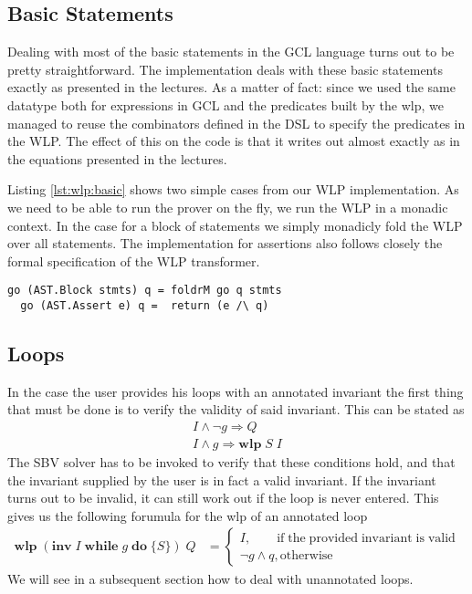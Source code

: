 \documentclass[]{scrartcl}
\newcommand{\IWHILE}[3]{\ensuremath{\mathbf{inv}\;#1\;\mathbf{while}\;#2\;\mathbf{do}\;\{#3\}}}
\newcommand{\WLP}[2]{\ensuremath{\mathbf{wlp}\;#1\;#2}}
\begin{document}
\subsection{Basic Statements}

Dealing with most of the basic statements in the GCL language turns out to
be pretty straightforward. The implementation deals with these basic statements
exactly as presented in the lectures.
As a matter of fact: since we used the same datatype both for expressions in GCL
and the predicates built by the wlp, we managed to reuse the combinators defined
in the DSL to specify the predicates in the WLP. The effect of this on the code
is that it writes out almost exactly as in the equations presented in the lectures.

Listing \ref{lst:wlp:basic} shows two simple cases from our WLP implementation.
As we need to be able to run the prover on the fly, we run the WLP in a monadic context.
In the case for a block of statements we simply monadicly fold the WLP over all statements.
The implementation for assertions also follows closely the formal specification of the
WLP transformer. 

\begin{lstlisting}[caption=WLP implementation example, label=lst:wlp:basic]
  go (AST.Block stmts) q = foldrM go q stmts
  go (AST.Assert e) q =  return (e /\ q)
\end{lstlisting}

\subsection{Loops}

In the case the user provides his loops with an annotated invariant the first
thing that must be done is to verify the validity of said invariant.
This can be stated as
\begin{align}
  I \land \neg g \Rightarrow Q \\
  I \land g \Rightarrow \WLP{S}{I}
\end{align}
The SBV solver has to be invoked to verify that these conditions hold, and that
the invariant supplied by the user is in fact a valid invariant.
If the invariant turns out to be invalid, it can still work out if the loop
is never entered. This gives us the following forumula for the wlp of an annotated
loop
\begin{align}
  \WLP{(\IWHILE{I}{g}{S})}{Q} &=
    \begin{cases}
      I, \qquad  \mathrm{if \; the \; provided \; invariant \; is \; valid}\\
      \neg g \land q, \mathrm{otherwise}
    \end{cases}
\end{align}
We will see in a subsequent section how to deal with unannotated loops.
\end{document}

